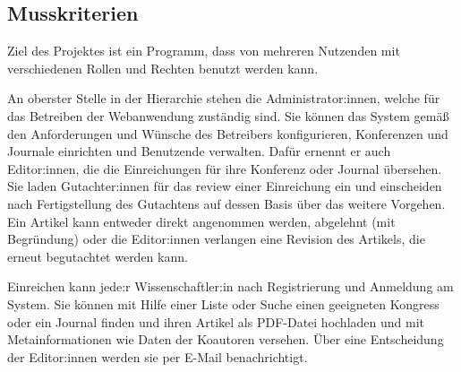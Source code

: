 
\subsection{Musskriterien}
Ziel des Projektes ist ein Programm, dass von mehreren Nutzenden mit verschiedenen Rollen und Rechten benutzt werden kann.

An oberster Stelle in der Hierarchie stehen die Administrator:innen, welche für das Betreiben der Webanwendung zuständig sind.
Sie können das System gemäß den Anforderungen und Wünsche des Betreibers konfigurieren, Konferenzen und Journale einrichten und Benutzende verwalten.
Dafür ernennt er auch Editor:innen, die die Einreichungen für ihre Konferenz oder Journal übersehen.
Sie laden Gutachter:innen für das review einer Einreichung ein und einscheiden nach Fertigstellung des Gutachtens auf dessen Basis über das weitere Vorgehen.
Ein Artikel kann entweder direkt angenommen werden, abgelehnt (mit Begründung) oder die Editor:innen verlangen eine Revision des Artikels, die erneut begutachtet werden kann.

Einreichen kann jede:r Wissenschaftler:in nach Registrierung und Anmeldung am System.
Sie können mit Hilfe einer Liste oder Suche einen geeigneten Kongress oder ein Journal finden und ihren Artikel als PDF-Datei hochladen und mit Metainformationen wie Daten der Koautoren versehen.
Über eine Entscheidung der Editor:innen werden sie per E-Mail benachrichtigt.